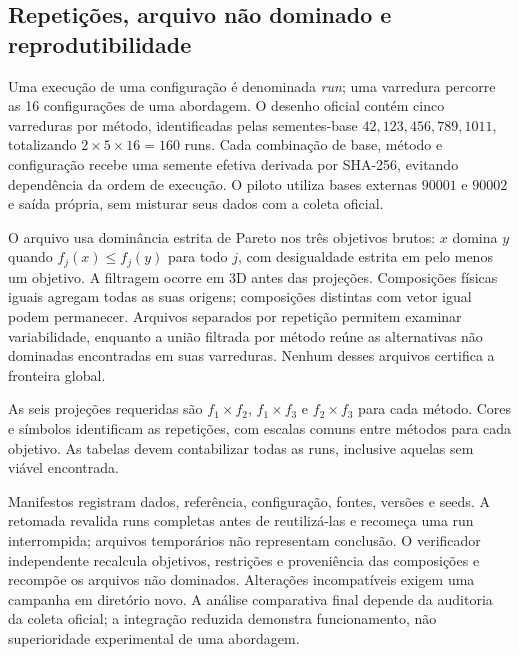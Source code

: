 \documentclass[12pt,a4paper]{article}
\begin{document}
\subsection{Repetições, arquivo não dominado e reprodutibilidade}

Uma execução de uma configuração é denominada \emph{run}; uma varredura
percorre as 16 configurações de uma abordagem. O desenho oficial contém
cinco varreduras por método, identificadas pelas sementes-base
$42,123,456,789,1011$, totalizando $2\times5\times16=160$ runs.
Cada combinação de base, método e configuração recebe uma semente efetiva
derivada por SHA-256, evitando dependência da ordem de execução. O piloto
utiliza bases externas $90001$ e $90002$ e saída própria, sem misturar seus
dados com a coleta oficial.

O arquivo usa dominância estrita de Pareto nos três objetivos brutos:
$x$ domina $y$ quando $f_j(x)\leq f_j(y)$ para todo $j$, com desigualdade
estrita em pelo menos um objetivo. A filtragem ocorre em 3D antes das
projeções. Composições físicas iguais agregam todas as suas origens;
composições distintas com vetor igual podem permanecer. Arquivos separados
por repetição permitem examinar variabilidade, enquanto a união filtrada
por método reúne as alternativas não dominadas encontradas em suas varreduras.
Nenhum desses arquivos certifica a fronteira global.

As seis projeções requeridas são $f_1\times f_2$, $f_1\times f_3$ e
$f_2\times f_3$ para cada método. Cores e símbolos identificam as repetições,
com escalas comuns entre métodos para cada objetivo. As tabelas devem
contabilizar todas as runs, inclusive aquelas sem viável encontrada.

Manifestos registram dados, referência, configuração, fontes, versões e seeds.
A retomada revalida runs completas antes de reutilizá-las e recomeça uma run
interrompida; arquivos temporários não representam conclusão. O verificador
independente recalcula objetivos, restrições e proveniência das composições
e recompõe os arquivos não dominados. Alterações incompatíveis exigem uma
campanha em diretório novo. A análise comparativa final depende da auditoria
da coleta oficial; a integração reduzida demonstra funcionamento, não
superioridade experimental de uma abordagem.




\end{document}
